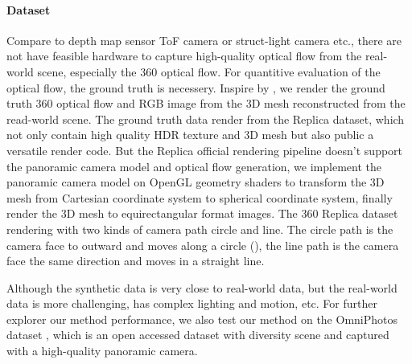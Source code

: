 \paragraph{Dataset}
%
%
%
Compare to depth map sensor ToF camera or struct-light camera etc., 
there are not have feasible hardware to capture high-quality optical flow from the real-world scene, especially the 360 optical flow.
%
For quantitive evaluation of the optical flow, the ground truth is necessery.
Inspire by \cite{shugrina2019creative}, we render the ground truth 360 optical flow and RGB image from the 3D mesh reconstructed from the read-world scene.
The ground truth data render from the Replica dataset\cite{StrauWMCWGEMRVCYBYPYZLCBGMPSBSNGLN2019}, which not only contain high quality HDR texture and 3D mesh but also public a versatile render code.
But the Replica official rendering pipeline doesn't support the panoramic camera model and optical flow generation, we implement the panoramic camera model on OpenGL geometry shaders to transform the 3D mesh from Cartesian coordinate system to spherical coordinate system, finally render the 3D mesh to equirectangular format images.
The 360 Replica dataset rendering with two kinds of camera path circle and line. The circle path is the camera face to outward and moves along a circle (), the line path is the camera face the same direction and moves in a straight line.

Although the synthetic data is very close to real-world data, but the real-world data is more challenging, has complex lighting and motion, etc. 
%
For further explorer our method performance, we also test our method on the OmniPhotos dataset \cite{BerteYLR2020}, which is an open accessed dataset with diversity scene and captured with a high-quality panoramic camera.

